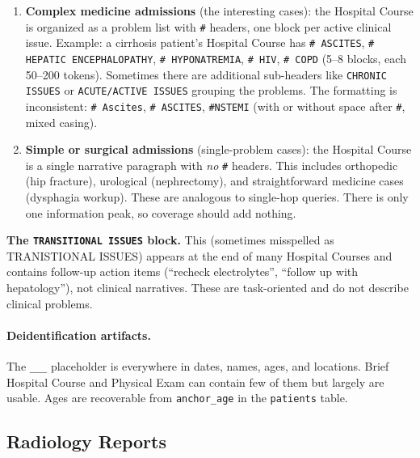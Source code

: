 \documentclass[11pt,a4paper]{article}
\newcommand{\field}[1]{\nolinkurl{#1}}
\begin{document}
\begin{enumerate}[leftmargin=*]
	\item \textbf{Complex medicine admissions} (the interesting cases):
	      the Hospital Course is organized as a problem list with
	      \texttt{\#} headers, one block per active clinical issue.
	      Example: a cirrhosis patient's Hospital Course has
	      \texttt{\# ASCITES}, \texttt{\# HEPATIC ENCEPHALOPATHY},
	      \texttt{\# HYPONATREMIA}, \texttt{\# HIV}, \texttt{\# COPD}
	      (5--8 blocks, each 50--200 tokens).  Sometimes there are
	      additional sub-headers like \texttt{CHRONIC ISSUES} or
	      \texttt{ACUTE/ACTIVE ISSUES} grouping the problems.
	      The formatting is inconsistent: \texttt{\# Ascites},
	      \texttt{\# ASCITES}, \texttt{\#NSTEMI} (with or without space
	      after \texttt{\#}, mixed casing).

	\item \textbf{Simple or surgical admissions} (single-problem cases):
	      the Hospital Course is a single narrative paragraph with \emph{no} \texttt{\#} headers.  This includes orthopedic (hip fracture), urological (nephrectomy), and straightforward medicine cases (dysphagia workup).  These are analogous to single-hop queries. There is only one information peak, so coverage should add nothing.
\end{enumerate}

\textbf{The \texttt{TRANSITIONAL ISSUES} block.}  This (sometimes misspelled as TRANISTIONAL ISSUES) appears at the
end of many Hospital Courses and contains follow-up action items
(``recheck electrolytes'', ``follow up with hepatology''), not clinical
narratives.  These are task-oriented and do not describe clinical problems.

\paragraph{Deidentification artifacts.}
The \texttt{\_\_\_} placeholder is everywhere in dates, names, ages, and locations.  Brief Hospital Course and Physical Exam can contain few of them but largely are usable. Ages are recoverable from \field{anchor\_age} in the \field{patients} table.

\subsection{Radiology Reports}
\label{sec:radiology}
\end{document}
